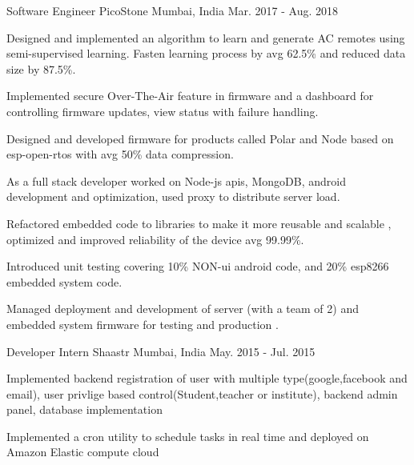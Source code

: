 

\begin{cventries}

	\cventry
	{Software Engineer} %
	{PicoStone} %
	{Mumbai, India} %
	{Mar. 2017 - Aug. 2018} %
	{ \begin{cvitems} %
			\item{Designed and implemented an algorithm to learn and generate AC remotes using semi-supervised learning. Fasten learning process by avg 62.5\% and reduced data size by 87.5\%.} %
      \item {Implemented secure Over-The-Air  feature in firmware and a dashboard for controlling firmware updates, view status with failure handling.}
      \item {Designed and developed firmware for products called Polar and Node based on esp-open-rtos with avg 50\% data compression.}  %
      \item {As a full stack developer worked on Node-js apis, MongoDB, android development and optimization, used proxy to distribute server load.}    
      \item {Refactored embedded code to libraries to make it more reusable and scalable , optimized and improved reliability of the device avg 99.99\%.}  %
      \item {Introduced unit testing covering 10\% NON-ui android code, and 20\% esp8266 embedded system code.}
      \item {Managed deployment and development of server (with a team of 2) and embedded system firmware for testing and production .}
     \end{cvitems}
  }


	\cventry
	{Developer Intern} %
	{Shaastr } %
	{Mumbai, India} %
	{May. 2015 - Jul. 2015} %
	{
		\begin{cvitems} %
			\item {Implemented backend registration of user with multiple type(google,facebook and email), user privlige based control(Student,teacher or institute), backend admin panel, database implementation}
			\item {Implemented a cron utility to schedule tasks in real time and deployed on Amazon Elastic compute cloud}
		\end{cvitems}
	}

\end{cventries}
